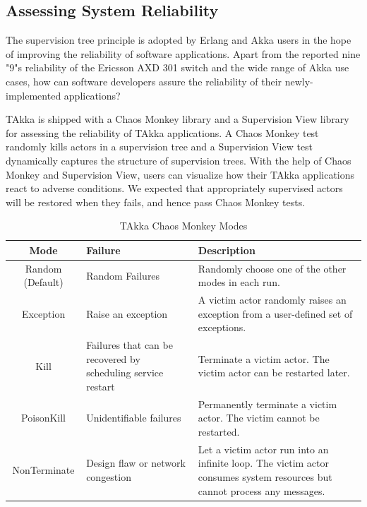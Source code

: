 
\subsection{Assessing System Reliability}
\label{reliability}







The supervision tree principle is adopted by Erlang and Akka users in the 
hope of improving the reliability of software applications.  Apart from the 
reported nine "9"s reliability of the Ericsson AXD 301 switch 
\citep{ArmstrongAXD} and the wide range of Akka use cases, how can software 
developers assure the reliability of their newly-implemented applications?  

TAkka is shipped with a Chaos Monkey library and a Supervision View library for 
assessing the reliability of TAkka applications.  A Chaos Monkey test randomly 
kills actors in a supervision tree and a Supervision View test dynamically 
captures the structure of supervision trees.  With the help of Chaos Monkey and 
Supervision View, users can visualize how their TAkka applications react to 
adverse conditions. 
We expected that appropriately supervised actors will be restored when they 
fails, and hence pass Chaos Monkey tests.

\begin{table}
\begin{tabular}{| c | p{5 cm} | p{8.8 cm} | }
\hline
Mode & Failure & Description \\
\hline
Random (Default) & Random Failures & Randomly choose one of the other modes in 
each run. \\
\hline
Exception & Raise an exception & A victim actor randomly raises an exception 
from 
a user-defined set of exceptions. \\
\hline
Kill & Failures that can be recovered by scheduling service restart &  
Terminate 
a victim actor.  The victim actor can be restarted later. \\
\hline
PoisonKill & Unidentifiable failures & Permanently terminate a victim actor.  
The victim cannot be restarted.  \\ 
\hline 
NonTerminate & Design flaw or network congestion & Let a victim actor run 
into an infinite loop.  The victim actor consumes system resources but cannot 
process any messages. \\
\hline

\end{tabular}
\label{chaos}
\caption{TAkka Chaos Monkey Modes}
\end{table}


